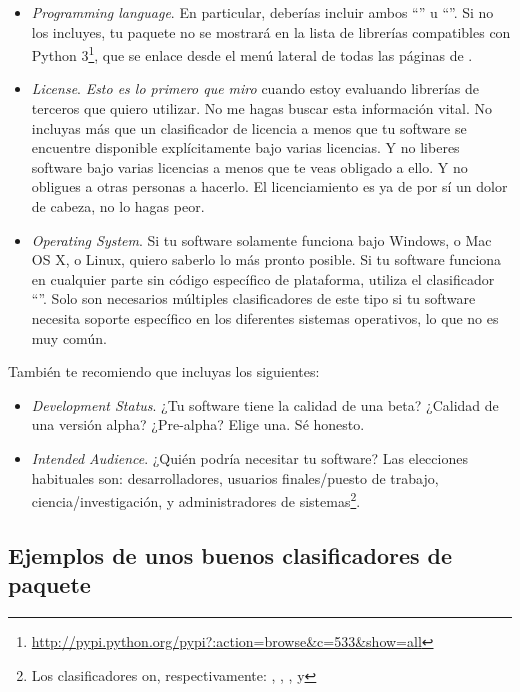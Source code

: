 \begin{itemize}
  \item \emph{Programming language}. En particular, deberías incluir ambos ``'' u ``''. Si no los incluyes, tu paquete no se mostrará en la lista de librerías compatibles con Python 3\footnote{\href{http://pypi.python.org/pypi?:action=browse\&c=533\&show=all}{http://pypi.python.org/pypi?:action=browse\&c=533\&show=all}}, que se enlace desde el menú lateral de todas las páginas de .
  \item \emph{License}. \emph{Esto es lo primero que miro} cuando estoy evaluando librerías de terceros que quiero utilizar. No me hagas buscar esta información vital. No incluyas más que un clasificador de licencia a menos que tu software se encuentre disponible explícitamente bajo varias licencias. Y no liberes software bajo varias licencias a menos que te veas obligado a ello. Y no obligues a otras personas a hacerlo. El licenciamiento es ya de por sí un dolor de cabeza, no lo hagas peor.
  \item \emph{Operating System}. Si tu software solamente funciona bajo Windows,  o Mac OS X, o Linux, quiero saberlo lo más pronto posible. Si tu software funciona en cualquier parte sin código específico de plataforma, utiliza el clasificador ``''. Solo son necesarios múltiples clasificadores de este tipo si tu software necesita soporte específico en los diferentes sistemas operativos, lo que no es muy común.

\end{itemize}

También te recomiendo que incluyas los siguientes:

\begin{itemize}
  \item \emph{Development Status}. ¿Tu software tiene la calidad de una beta? ¿Calidad de una versión alpha? ¿Pre-alpha? Elige una. Sé honesto.
  \item \emph{Intended Audience}. ¿Quién podría necesitar tu software? Las elecciones habituales son: desarrolladores, usuarios finales/puesto de trabajo, ciencia/investigación, y administradores de sistemas\footnote{Los clasificadores on, respectivamente: , , , y }.
\end{itemize}

\subsection{Ejemplos de unos buenos clasificadores de paquete}

